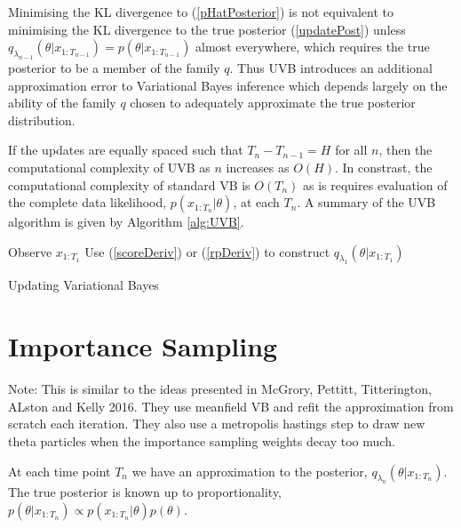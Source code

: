 \documentclass[12pt,a4paper]{article}\usepackage[]{graphicx}\usepackage[]{color}
\begin{document}
Minimising the KL divergence to (\ref{pHatPosterior}) is not equivalent to minimising the KL divergence to the true posterior (\ref{updatePost}) unless $q_{\lambda_{n-1}}(\theta |  x_{1:T_{n-1}}) = p(\theta |  x_{1:T_{n-1}})$ almost everywhere, which requires the true posterior to be a member of the family $q$. Thus UVB introduces an additional approximation error to Variational Bayes inference which depends largely on the ability of the family $q$ chosen to adequately approximate the true posterior distribution.

If the updates are equally spaced such that $T_n - T_{n-1} = H$ for all $n$, then the computational complexity of UVB as $n$ increases as $O(H)$. In constrast, the computational complexity of standard VB is $O(T_{n})$ as is requires evaluation of the complete data likelihood, $p(x_{1:T_{n}} | \theta)$, at each $T_{n}$. A summary of the UVB algorithm is given by Algorithm \ref{alg:UVB}.

\begin{algorithm}[H]
 Observe $x_{1:T_1}$\;
 Use (\ref{scoreDeriv}) or (\ref{rpDeriv}) to construct $q_{\lambda_1}(\theta | x_{1:T_1})$\;
 \caption{Updating Variational Bayes}
  \label{alg:UVB}
\end{algorithm}

\section{Importance Sampling} \label{sec:IS}

Note: This is similar to the ideas presented in McGrory, Pettitt, Titterington, ALston and Kelly 2016. They use meanfield VB and refit the approximation from scratch each iteration. They also use a metropolis hastings step to draw new theta particles when the importance sampling weights decay too much.

At each time point $T_n$ we have an approximation to the posterior, $q_{\lambda_n}(\theta | x_{1:T_n})$. The true posterior is known up to proportionality, $p(\theta | x_{1:T_n}) \propto p(x_{1:T_n} | \theta)p(\theta)$. 
\\
\end{document}

